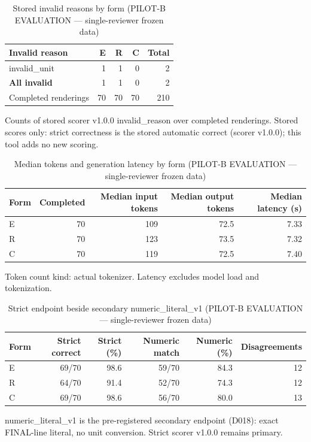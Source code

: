 \begin{table}[t]
\centering
\small
\caption{Stored invalid reasons by form (PILOT-B EVALUATION --- single-reviewer frozen data)}
\label{tab:pilotb-Qwen3-8B-invalid}
\begin{tabular}{lrrrr}
\toprule
Invalid reason & E & R & C & Total \\
\midrule
invalid\_unit & 1 & 1 & 0 & 2 \\
\textbf{All invalid} & 1 & 1 & 0 & 2 \\
Completed renderings & 70 & 70 & 70 & 210 \\
\bottomrule
\end{tabular}
\par\smallskip
\parbox{\linewidth}{\footnotesize Counts of stored scorer v1.0.0 invalid\_reason over completed renderings. Stored scores only: strict correctness is the stored automatic correct (scorer v1.0.0); this tool adds no new scoring.}
\end{table}

\begin{table}[t]
\centering
\small
\caption{Median tokens and generation latency by form (PILOT-B EVALUATION --- single-reviewer frozen data)}
\label{tab:pilotb-Qwen3-8B-resources}
\begin{tabular}{lrrrr}
\toprule
Form & Completed & Median input tokens & Median output tokens & Median latency (s) \\
\midrule
E & 70 & 109 & 72.5 & 7.33 \\
R & 70 & 123 & 73.5 & 7.32 \\
C & 70 & 119 & 72.5 & 7.40 \\
\bottomrule
\end{tabular}
\par\smallskip
\parbox{\linewidth}{\footnotesize Token count kind: actual tokenizer. Latency excludes model load and tokenization.}
\end{table}

\begin{table}[t]
\centering
\small
\caption{Strict endpoint beside secondary numeric\_literal\_v1 (PILOT-B EVALUATION --- single-reviewer frozen data)}
\label{tab:pilotb-Qwen3-8B-numeric}
\begin{tabular}{lrrrrr}
\toprule
Form & Strict correct & Strict (\%) & Numeric match & Numeric (\%) & Disagreements \\
\midrule
E & 69/70 & 98.6 & 59/70 & 84.3 & 12 \\
R & 64/70 & 91.4 & 52/70 & 74.3 & 12 \\
C & 69/70 & 98.6 & 56/70 & 80.0 & 13 \\
\bottomrule
\end{tabular}
\par\smallskip
\parbox{\linewidth}{\footnotesize numeric\_literal\_v1 is the pre-registered secondary endpoint (D018): exact FINAL-line literal, no unit conversion. Strict scorer v1.0.0 remains primary.}
\end{table}
